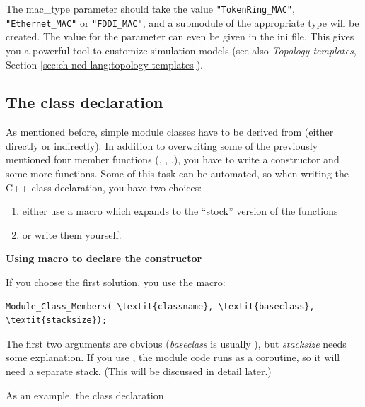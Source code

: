 \begin{sloppypar}
The mac\_type parameter should take the value \texttt{"TokenRing\_MAC"},
\texttt{"Ethernet\_MAC"} or \texttt{"FDDI\_MAC"}, and a submodule of the appropriate
type will be created. The value for the parameter can even be given in
the ini file. This gives you a powerful tool to customize simulation
models (see also \textit{Topology templates}, Section
\ref{sec:ch-ned-lang:topology-templates}).
\end{sloppypar}




\subsection{The class declaration}

As mentioned before, simple module classes have
to be derived from  (either directly or
indirectly). In addition to overwriting some of the previously
mentioned four member functions (,
, ,), you
have to write a constructor and some more
functions. Some of this task can be automated, so when writing the C++
class declaration, you have two choices:
\begin{enumerate}
\item{either use a macro which expands to the ``stock'' version of the
    functions}
\item{or write them yourself.}
\end{enumerate}

\textbf{Using macro to declare the constructor}

If you choose the first solution, you use the
 macro:

\begin{Verbatim}[commandchars=\\\{\}]
Module_Class_Members( \textit{classname}, \textit{baseclass}, \textit{stacksize});
\end{Verbatim}

The first two arguments are obvious (\textit{baseclass} is usually ),
but \textit{stacksize} needs some explanation. If you use ,
the module code runs as a coroutine, so it will need a separate
stack. (This will be discussed in detail later.)


As an example, the class declaration

